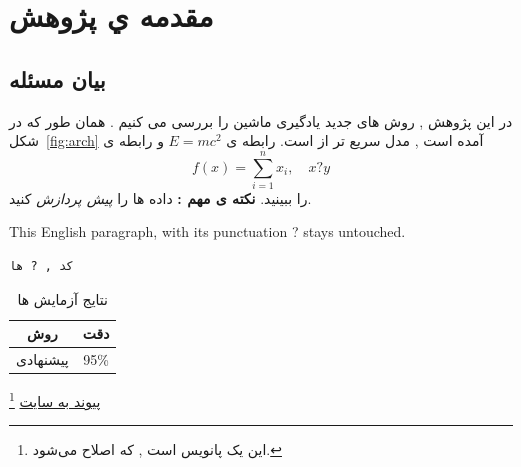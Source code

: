 \documentclass[12pt]{report}
\begin{document}
\chapter{مقدمه ي پژوهش}
\section{بيان مسئله}
در این پژوهش , روش های جدید یادگیری ماشین را بررسی می کنیم \cite{goodfellow2016}.
همان طور که در شکل~\ref{fig:arch} آمده است , مدل  سریع تر از  است.
رابطه ی $E = mc^2$ و رابطه ی
\begin{equation}
  f(x) = \sum_{i=1}^{n} x_i , \quad x ? y
\end{equation}
را ببینید. \textbf{نکته ی مهم :} داده ها را \emph{پیش پردازش} کنید.
\begin{latin}
This English paragraph, with its punctuation ? stays untouched.
\end{latin}
\begin{verbatim}
كد , ? ها
\end{verbatim}
\begin{table}[h]
\centering
\caption{نتایج آزمایش ها}
\begin{tabular}{|c|c|}
\hline
روش & دقت \\
\hline
پیشنهادی & 95\% \\
\hline
\end{tabular}
\label{tab:results}
\end{table}
\footnote{این یک پانویس است , که اصلاح می‌شود.}
\href{https://example.com/كتاب}{پیوند به سایت}
\end{document}
